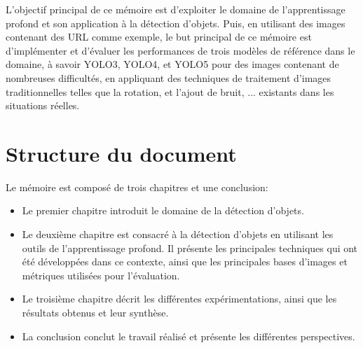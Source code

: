 L'objectif principal de ce mémoire est d'exploiter le domaine de l'apprentissage profond et son application à la détection d'objets. Puis, en utilisant des images contenant des URL comme exemple, le but principal de ce mémoire est d'implémenter et d'évaluer les performances de trois  modèles de référence dans le domaine, à savoir  YOLO3, YOLO4, et YOLO5 pour des images contenant de nombreuses difficultés, en appliquant des techniques de traitement d'images traditionnelles telles que la rotation, et l'ajout de bruit, ...  existants dans les situations réelles.

\section*{Structure du document}
Le mémoire est composé de trois chapitres et une conclusion:

\begin{itemize}
\item Le premier chapitre introduit le domaine de la détection d'objets.
\item Le deuxième chapitre est consacré à la détection d'objets en utilisant les outils de l'apprentissage profond. Il présente les principales techniques qui ont été développées dans ce contexte, ainsi que les principales bases d'images et métriques utilisées pour l'évaluation.
\item Le troisième chapitre décrit les différentes expérimentations, ainsi que les résultats obtenus et leur synthèse.
\item La conclusion conclut le travail réalisé et présente les différentes perspectives.
\end{itemize}